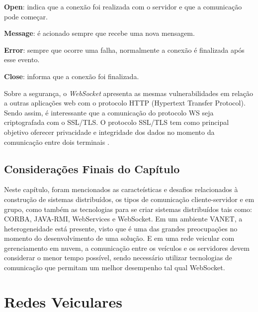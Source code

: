 \documentclass[
	12pt,				%
	oneside,			%
	a4paper,			%
	english,			%
	brazil				%
	]{abntex2ppgsi}
\begin{document}
\begin{itemize*}
	\item{\textbf{Open}: indica que a conexão foi realizada com o servidor e que a comunicação pode começar.}
	\item{\textbf{Message}: é acionado sempre que recebe uma nova mensagem.}
	\item{\textbf{Error}: sempre que ocorre uma falha, normalmente a conexão é finalizada após esse evento.}
	\item{\textbf{Close}: informa que a conexão foi finalizada.}
\end{itemize*}

Sobre a segurança, o \textit{WebSocket} apresenta as mesmas vulnerabilidades em relação a outras aplicações web com o protocolo HTTP (Hypertext Transfer Protocol). Sendo assim, é interessante que a comunicação do protocolo WS seja criptografada com o SSL/TLS.  O protocolo SSL/TLS tem como principal objetivo oferecer privacidade e integridade dos dados no momento da comunicação entre dois terminais \cite{themudo2014implementaccao}. %


\section{Considerações Finais do Capítulo}
 
Neste capítulo, foram mencionados as caracteísticas e desafios relacionados à construção de sistemas distribuídos, os tipos de comunicação cliente-servidor e em grupo, como também as tecnologias para se criar sistemas distribuídos tais como: CORBA, JAVA-RMI, WebServices e WebSocket. Em um ambiente VANET, a heterogeneidade está presente, visto que é uma das grandes preocupações no momento do desenvolvimento de uma solução. E em uma rede veicular com gerenciamento em nuvem, a comunicação entre os veículos e os servidores devem considerar o menor tempo possível, sendo necessário utilizar tecnologias de comunicação que permitam um melhor desempenho tal qual WebSocket.

\chapter{Redes Veiculares}
\end{document}
